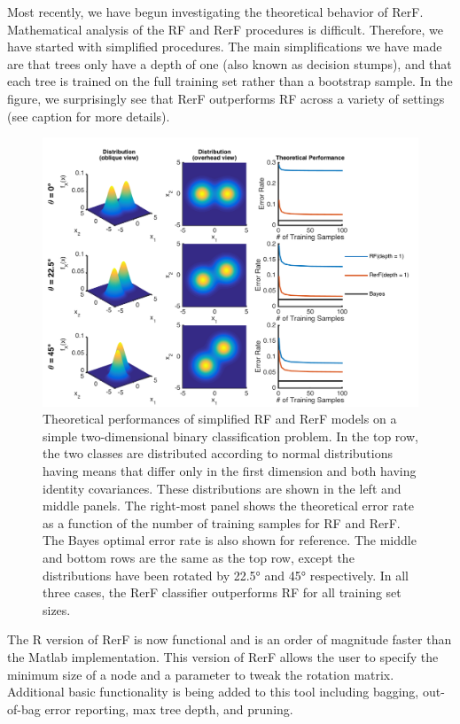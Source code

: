 \documentclass[simplex.tex]{subfiles}
\begin{document}
\clearpage
Most recently, we have begun investigating the theoretical behavior of RerF. Mathematical analysis of the RF and RerF procedures is difficult. Therefore, we have started with simplified procedures. The main simplifications we have made are that trees only have a depth of one (also known as decision stumps), and that each tree is trained on the full training set rather than a bootstrap sample. In the figure, we surprisingly see that RerF outperforms RF across a variety of settings (see caption for more details).

\begin{figure}[h!]
\begin{cframed}
\centering
\includegraphics[height=0.4\textheight]{../../figs/RerF_2017_03.png}
\caption{
Theoretical performances of simplified RF and RerF models on a simple two-dimensional binary classification problem. In the top row, the two classes are distributed according to normal distributions having means that differ only in the first dimension and both having identity covariances. These distributions are shown in the left and middle panels. The right-most panel shows the theoretical error  rate as a function of the number of training samples for RF and RerF. The Bayes optimal error rate is also shown for reference. The middle and bottom rows are the same as the top row, except the distributions have been rotated by 22.5° and 45° respectively. In all three cases, the RerF classifier outperforms RF for all training set sizes.
}
\label{fig:RerF}
\end{cframed}
\end{figure}

The R version of RerF is now functional and is an order of magnitude faster than the Matlab implementation.  This version of RerF allows the user to specify the minimum size of a node and a parameter to tweak the rotation matrix.  Additional basic functionality is being added to this tool including bagging, out-of-bag error reporting, max tree depth, and pruning.   

\clearpage
\end{document}

